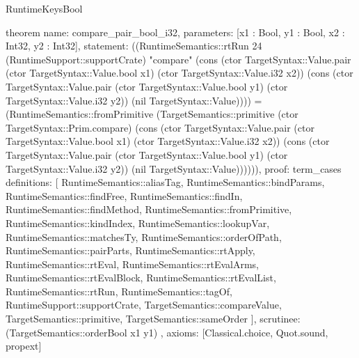 \begin{lexlean}{RuntimeKeysBool}
\begin{semanticmodule}
theorem{
  name: compare_pair_bool_i32,
  parameters: [x1 : Bool, y1 : Bool, x2 : Int32, y2 : Int32],
  statement: ((RuntimeSemantics::rtRun 24 (RuntimeSupport::supportCrate) "compare" (cons (ctor TargetSyntax::Value.pair (ctor TargetSyntax::Value.bool x1) (ctor TargetSyntax::Value.i32 x2)) (cons (ctor TargetSyntax::Value.pair (ctor TargetSyntax::Value.bool y1) (ctor TargetSyntax::Value.i32 y2)) (nil TargetSyntax::Value)))) = (RuntimeSemantics::fromPrimitive (TargetSemantics::primitive (ctor TargetSyntax::Prim.compare) (cons (ctor TargetSyntax::Value.pair (ctor TargetSyntax::Value.bool x1) (ctor TargetSyntax::Value.i32 x2)) (cons (ctor TargetSyntax::Value.pair (ctor TargetSyntax::Value.bool y1) (ctor TargetSyntax::Value.i32 y2)) (nil TargetSyntax::Value)))))),
  proof: term_cases{
    definitions: [
      RuntimeSemantics::aliasTag,
      RuntimeSemantics::bindParams,
      RuntimeSemantics::findFree,
      RuntimeSemantics::findIn,
      RuntimeSemantics::findMethod,
      RuntimeSemantics::fromPrimitive,
      RuntimeSemantics::kindIndex,
      RuntimeSemantics::lookupVar,
      RuntimeSemantics::matchesTy,
      RuntimeSemantics::orderOfPath,
      RuntimeSemantics::pairParts,
      RuntimeSemantics::rtApply,
      RuntimeSemantics::rtEval,
      RuntimeSemantics::rtEvalArms,
      RuntimeSemantics::rtEvalBlock,
      RuntimeSemantics::rtEvalList,
      RuntimeSemantics::rtRun,
      RuntimeSemantics::tagOf,
      RuntimeSupport::supportCrate,
      TargetSemantics::compareValue,
      TargetSemantics::primitive,
      TargetSemantics::sameOrder
    ],
    scrutinee: (TargetSemantics::orderBool x1 y1)
  },
  axioms: [Classical.choice, Quot.sound, propext]
}


\end{semanticmodule}
\end{lexlean}
